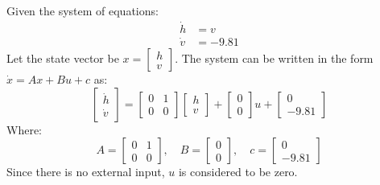 \documentclass{article}
\begin{document}
Given the system of equations:
\begin{align*}
\dot{h} &= v \\
\dot{v} &= -9.81
\end{align*}
Let the state vector be $x = \begin{bmatrix} h \\ v \end{bmatrix}$. The system can be written in the form $\dot{x} = Ax + Bu + c$ as:
\[
\begin{bmatrix} \dot{h} \\ \dot{v} \end{bmatrix} = 
\begin{bmatrix} 0 & 1 \\ 0 & 0 \end{bmatrix} 
\begin{bmatrix} h \\ v \end{bmatrix} + 
\begin{bmatrix} 0 \\ 0 \end{bmatrix} u +
\begin{bmatrix} 0 \\ -9.81 \end{bmatrix}
\]
Where:
\[
A = \begin{bmatrix} 0 & 1 \\ 0 & 0 \end{bmatrix}, \quad B = \begin{bmatrix} 0 \\ 0 \end{bmatrix}, \quad c = \begin{bmatrix} 0 \\ -9.81 \end{bmatrix}
\]
Since there is no external input, $u$ is considered to be zero.
\end{document}
